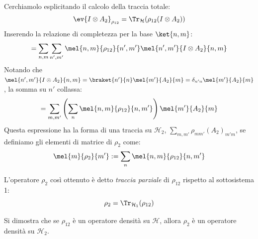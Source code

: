 Cerchiamolo esplicitando il calcolo della traccia totale:
\[
    \ev{I \otimes A_2}_{\rho_{12}} = \Tr_{\mathcal{H}}(\rho_{12} (I \otimes A_2))
\]
Inserendo la relazione di completezza per la base \( \ket{n,m} \):
\[
    = \sum_{n,m} \sum_{n',m'} \mel{n,m}{\rho_{12}}{n',m'} \mel{n',m'}{I \otimes A_2}{n,m}
\]
Notando che \( \mel{n',m'}{I \otimes A_2}{n,m} = \braket{n'}{n}\mel{m'}{A_2}{m} = \delta_{n'n}\mel{m'}{A_2}{m} \), la somma su \( n' \) collassa:
\[
    = \sum_{m,m'} \left( \sum_n \mel{n,m}{\rho_{12}}{n,m'} \right) \mel{m'}{A_2}{m}
\]
Questa espressione ha la forma di una traccia su \( \mathcal{H}_2 \), \( \sum_{m,m'} \rho_{mm'} (A_2)_{m'm} \), se definiamo gli elementi di matrice di \( \rho_2 \) come:
\begin{equation}
    \mel{m}{\rho_2}{m'} := \sum_n \mel{n,m}{\rho_{12}}{n,m'}
\end{equation}

\begin{definition}
    L'operatore \( \rho_2 \) così ottenuto è detto \textit{traccia parziale} di \( \rho_{12} \) rispetto al sottosistema 1:
    \begin{equation}
        \rho_2 = \Tr_{\mathcal{H}_1}(\rho_{12})
    \end{equation}
\end{definition}

Si dimostra che se \( \rho_{12} \) è un operatore densità su \( \mathcal{H} \), allora \( \rho_2 \) è un operatore densità su \( \mathcal{H}_2 \).

